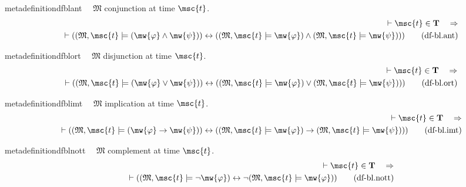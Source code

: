 \begin{restatable}{metadefinition}{dfblant}~~ $\mathfrak{M}$ conjunction at time
$\msc{t}$.
\begin{align}
\vdash \msc{t} \in \mathbf{T}\quad\Rightarrow \notag \\ 
	\quad \vdash ( ( \mathfrak{M} ,
    \msc{t} \models ( \mw{\varphi} \wedge \mw{\psi} ) ) \leftrightarrow ( (
    \mathfrak{M} , \msc{t} \models \mw{\varphi} ) \wedge ( \mathfrak{M} ,
    \msc{t} \models \mw{\psi} ) ) )\label{eq:df-bl.ant}\tag{df-bl.ant}
\end{align}
\end{restatable}

\begin{restatable}{metadefinition}{dfblort}~~ $\mathfrak{M}$ disjunction at time
$\msc{t}$.
\begin{align}
\vdash \msc{t} \in \mathbf{T}\quad\Rightarrow \notag \\ 
	\quad \vdash ( ( \mathfrak{M} ,
    \msc{t} \models ( \mw{\varphi} \vee \mw{\psi} ) ) \leftrightarrow ( (
    \mathfrak{M} , \msc{t} \models \mw{\varphi} ) \vee ( \mathfrak{M} , \msc{t}
    \models \mw{\psi} ) ) )\label{eq:df-bl.ort}\tag{df-bl.ort}
\end{align}
\end{restatable}

\begin{restatable}{metadefinition}{dfblimt}~~ $\mathfrak{M}$ implication at time
$\msc{t}$.
\begin{align}
\vdash \msc{t} \in \mathbf{T}\quad\Rightarrow \notag \\ 
	\quad \vdash ( ( \mathfrak{M} ,
    \msc{t} \models ( \mw{\varphi} \rightarrow \mw{\psi} ) ) \leftrightarrow (
    ( \mathfrak{M} , \msc{t} \models \mw{\varphi} ) \rightarrow ( \mathfrak{M}
    , \msc{t} \models \mw{\psi} ) ) )\label{eq:df-bl.imt}\tag{df-bl.imt}
\end{align}
\end{restatable}

\begin{restatable}{metadefinition}{dfblnott}~~ $\mathfrak{M}$ complement at time
$\msc{t}$.
\begin{align}
\vdash \msc{t} \in \mathbf{T}\quad\Rightarrow \notag \\ 
	\quad \vdash ( ( \mathfrak{M} ,
    \msc{t} \models \lnot \mw{\varphi} ) \leftrightarrow \lnot ( \mathfrak{M} ,
    \msc{t} \models \mw{\varphi} ) )\label{eq:df-bl.nott}\tag{df-bl.nott}
\end{align}
\end{restatable}

